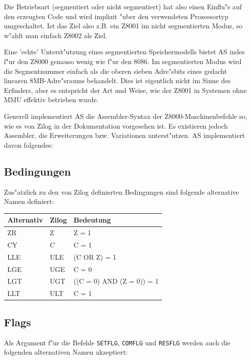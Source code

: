 \documentclass[12pt,a4paper,twoside]{report}
\newcommand{\tty}[1]{{\tt #1}}
\newcommand{\asname}{AS}
\begin{document}
Die Betriebsart (segmentiert oder nicht segmentiert) hat also einen
Einflu"s auf den erzeugten Code und wird implizit "uber den verwendeten
Prozessortyp umgeschaltet.  Ist das Ziel also z.B. ein Z8001 im nicht
segmentierten Modus, so w"ahlt man einfach Z8002 als Ziel.

Eine 'echte' Unterst"utzung eines segmentierten Speichermodells bietet
\asname{} indes f"ur den Z8000 genauso wenig wie f"ur den 8086.  Im segmentierten
Modus wird die Segmentnummer einfach als die oberen sieben Adre"sbits
eines gedacht linearen 8MB-Adre"sraums behandelt.  Dies ist eigentlich
nicht im Sinne des Erfinders, aber es entspricht der Art und Weise, wie
der Z8001 in Systemen ohne MMU effektiv betrieben wurde.

Generell implementiert \asname{} die Assembler-Syntax der Z8000-Maschinenbefehle
so, wie es von Zilog in der Dokumentation vorgesehen ist.  Es existieren
jedoch Assembler, die Erweiterungen bzw. Variationen unterst"utzen.  \asname{}
implementiert davon folgendes:

\subsection{Bedingungen}

Zus"atzlich zu den von Zilog definierten Bedingungen sind folgende alternative
Namen definiert:

\begin{center}\begin{tabular}{|l|l|l|}
\hline
Alternativ & Zilog & Bedeutung \\
\hline
\hline
ZR         & Z     & Z = 1 \\
CY         & C     & C = 1 \\
LLE        & ULE   & (C OR Z) = 1 \\
LGE        & UGE   & C = 0 \\
LGT        & UGT   & ((C = 0) AND (Z = 0)) = 1 \\
LLT        & ULT   & C = 1 \\
\hline
\end{tabular}\end{center}

\subsection{Flags}

Als Argument f"ur die Befehle \tty{SETFLG}, \tty{COMFLG} und \tty{RESFLG} werden
auch die folgenden alternativen Namen akzeptiert:
\end{document}
